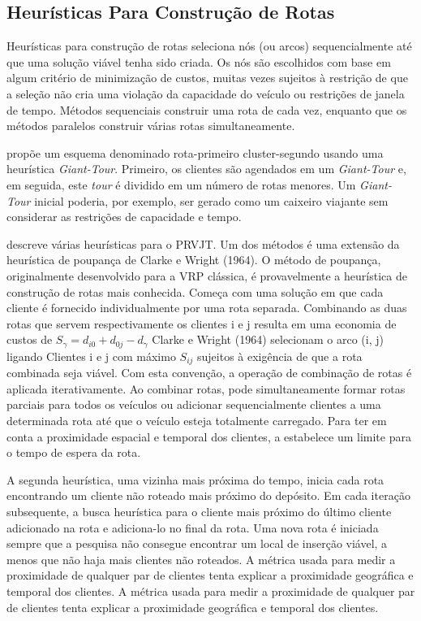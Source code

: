  
\subsection{Heurísticas Para Construção de Rotas }


Heurísticas para construção de rotas seleciona nós (ou arcos) sequencialmente até que uma solução viável tenha sido criada. Os nós são escolhidos com base em algum critério de minimização de custos, muitas vezes sujeitos à restrição de que a seleção não cria uma violação da capacidade do veículo ou restrições de janela de tempo. Métodos sequenciais construir uma rota de cada vez, enquanto que os métodos paralelos construir várias rotas simultaneamente.



\cite{solomon87} propõe um esquema denominado rota-primeiro cluster-segundo usando uma heurística \textit{Giant-Tour}. Primeiro, os clientes são agendados em um \textit{Giant-Tour} e, em seguida, este \textit{tour} é dividido em um número de rotas menores. Um \textit{Giant-Tour} inicial poderia, por exemplo, ser gerado como um caixeiro viajante sem considerar as restrições de capacidade e tempo.


\cite{solomon87} descreve várias heurísticas para o PRVJT. Um dos métodos é uma extensão da heurística de poupança de Clarke e Wright (1964). O método de poupança, originalmente desenvolvido para a VRP clássica, é provavelmente a heurística de construção de rotas mais conhecida. Começa com uma solução em que cada cliente é fornecido individualmente por uma rota separada. Combinando as duas rotas que servem respectivamente os clientes i e j resulta em uma economia de custos de $ S_\gamma = d_{i0} + d_{0j} -d_\gamma $ Clarke e Wright (1964) selecionam o arco (i, j) ligando Clientes i e j com máximo $ S_ {ij} $ sujeitos à exigência de que a rota combinada seja viável. Com esta convenção, a operação de combinação de rotas é aplicada iterativamente. Ao combinar rotas, pode simultaneamente formar rotas parciais para todos os veículos ou adicionar sequencialmente clientes a uma determinada rota até que o veículo esteja totalmente carregado. Para ter em conta a proximidade espacial e temporal dos clientes, a \cite{solomon87} estabelece um limite para o tempo de espera da rota. 


A segunda heurística, uma vizinha mais próxima do tempo, inicia cada rota encontrando um cliente não roteado mais próximo do depósito. Em cada iteração subsequente, a busca heurística para o cliente mais próximo do último cliente adicionado na rota e adiciona-lo no final da rota. Uma nova rota é iniciada sempre que a pesquisa não consegue encontrar um local de inserção viável, a menos que não haja mais clientes não roteados. A métrica usada para medir a proximidade de qualquer par de clientes tenta explicar a proximidade geográfica e temporal dos clientes. A métrica usada para medir a proximidade de qualquer par de clientes tenta explicar a proximidade geográfica e temporal dos clientes.


